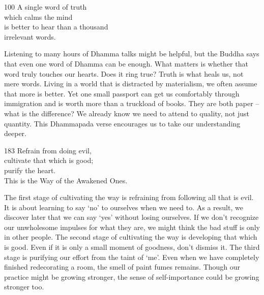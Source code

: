 
\begin{dhpVerse}{100}
\label{dhp-100}
A single word of truth\\
which calms the mind\\
is better to hear than a thousand\\
irrelevant words.
\end{dhpVerse}

\begin{dhpRefl}
  Listening to many hours of Dhamma talks might be helpful, but the Buddha says
  that even one word of Dhamma can be enough. What matters is whether that word
  truly touches our hearts. Does it ring true? Truth is what heals us, not mere
  words. Living in a world that is distracted by materialism, we often assume
  that more is better. Yet one small passport can get us comfortably through
  immigration and is worth more than a truckload of books. They are both paper --
  what is the difference? We already know we need to attend to quality, not just
  quantity. This Dhammapada verse encourages us to take our understanding
  deeper.
\end{dhpRefl}


\begin{dhpVerse}{183}
\label{dhp-183}
Refrain from doing evil,\\
cultivate that which is good;\\
purify the heart.\\
This is the Way of the Awakened Ones.
\end{dhpVerse}

\begin{dhpRefl}
  The first stage of cultivating the way is refraining from following all that
  is evil. It is about learning to say ‘no’ to ourselves when we need to. As a
  result, we discover later that we can say ‘yes’ without losing ourselves. If
  we don’t recognize our unwholesome impulses for what they are, we might think
  the bad stuff is only in other people. The second stage of cultivating the way
  is developing that which is good. Even if it is only a small moment of
  goodness, don’t dismiss it. The third stage is purifying our effort from the
  taint of ‘me’. Even when we have completely finished redecorating a room, the
  smell of paint fumes remains. Though our practice might be growing stronger,
  the sense of self-importance could be growing stronger too.
\end{dhpRefl}

